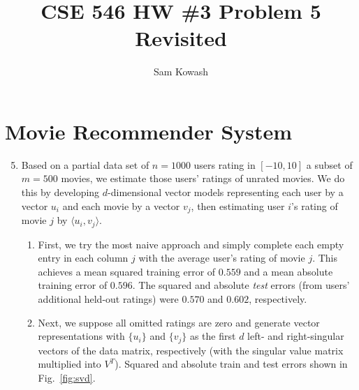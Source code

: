 \documentclass[11pt,letterpaper]{article}
\author{Sam Kowash}
\title{CSE 546 HW \#3 Problem 5 Revisited}
\theoremstyle{definition}
\theoremstyle{plain}
\numberwithin{equation}{section}
\numberwithin{figure}{section}
\begin{document}
\maketitle


\section{Movie Recommender System}
\begin{enumerate}
\setcounter{enumi}{4}
	\item 	Based on a partial data set of $n=1000$ users rating in $[-10,10]$ a subset of $m=500$ movies, we estimate those users' ratings of unrated movies. We do this by developing $d$-dimensional vector models representing each user by a vector $u_i$ and each movie by a vector $v_j$, then estimating user $i$'s rating of movie $j$ by $\langle u_i, v_j \rangle$.
	\begin{enumerate}
		\item First, we try the most naive approach and simply complete each empty entry in each column $j$ with the average user's rating of movie $j$. This achieves a mean squared training error of $0.559$ and a mean absolute training error of $0.596$. The squared and absolute \emph{test} errors (from users' additional held-out ratings) were $0.570$ and $0.602$, respectively.

		\item Next, we suppose all omitted ratings are zero and generate vector representations with $\{u_i\}$ and $\{v_j\}$ as the first $d$ left- and right-singular vectors of the data matrix, respectively (with the singular value matrix multiplied into $V^T$). Squared and absolute train and test errors shown in Fig.~\ref{fig:svd}.


\end{enumerate}
\end{enumerate}
\end{document}
